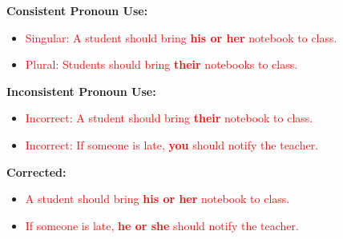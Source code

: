 \documentclass[12pt]{article}
\begin{document}
\begin{tcolorbox}[colframe=black!60, colback=white, 
coltitle=black, colbacktitle=black!15, fonttitle=\bfseries\Large, 
title=Examples of Pronoun Agreement, halign title=center, left=10pt, right=10pt, top=10pt, bottom=15pt]

\textbf{Consistent Pronoun Use:}
\begin{itemize}
    \item \textcolor{red}{Singular: A student should bring \textbf{his or her} notebook to class.}  
    \item \textcolor{red}{Plural: Students should bring \textbf{their} notebooks to class.}  
\end{itemize}

\textbf{Inconsistent Pronoun Use:}
\begin{itemize}
    \item \textcolor{red}{Incorrect: A student should bring \textbf{their} notebook to class.}  
    \item \textcolor{red}{Incorrect: If someone is late, \textbf{you} should notify the teacher.}  
\end{itemize}

\textbf{Corrected:}
\begin{itemize}
    \item \textcolor{red}{A student should bring \textbf{his or her} notebook to class.}  
    \item \textcolor{red}{If someone is late, \textbf{he or she} should notify the teacher.}  
\end{itemize}

\end{tcolorbox}

\vspace{1em}
\end{document}
